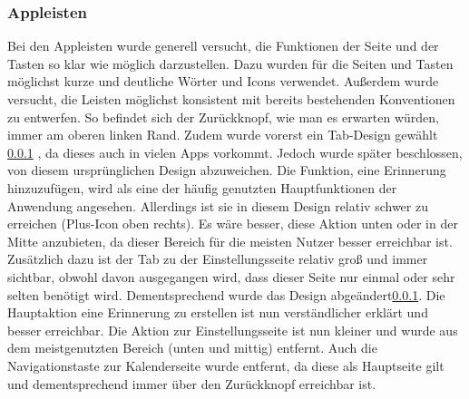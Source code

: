 \subsubsection{Appleisten}
Bei den Appleisten wurde generell versucht, die Funktionen der Seite und der Tasten so klar wie möglich darzustellen. %
	Dazu wurden für die Seiten und Tasten möglichst kurze und deutliche Wörter und Icons verwendet. %
	Außerdem wurde versucht, die Leisten möglichst konsistent mit bereits bestehenden Konventionen zu entwerfen. So befindet sich der Zurückknopf, wie man es erwarten würden, immer am oberen linken Rand. Zudem wurde vorerst ein \glqq Tab-Design\grqq{} gewählt \ref{} \myTodo, da dieses auch in vielen Apps vorkommt.\newline%
	Jedoch wurde später beschlossen, von diesem ursprünglichen Design abzuweichen. Die Funktion, eine Erinnerung hinzuzufügen, wird als eine der häufig genutzten Hauptfunktionen der Anwendung angesehen. Allerdings ist sie in diesem Design relativ schwer zu erreichen (Plus-Icon oben rechts). Es wäre besser, diese Aktion unten oder in der Mitte anzubieten, da dieser Bereich für die meisten Nutzer besser erreichbar ist\cite{konventionen_platforms_ios}. Zusätzlich dazu ist der Tab zu der Einstellungsseite relativ groß und immer sichtbar, obwohl davon ausgegangen wird, dass dieser Seite nur einmal oder sehr selten benötigt wird.\newline%
	Dementsprechend wurde das Design abgeändert\ref{}\myTodo. Die Hauptaktion eine Erinnerung zu erstellen ist nun verständlicher erklärt und besser erreichbar. Die Aktion zur Einstellungsseite ist nun kleiner und wurde aus dem meistgenutzten Bereich (unten und mittig) entfernt. Auch die Navigationstaste zur Kalenderseite wurde entfernt, da diese als Hauptseite gilt und dementsprechend immer über den Zurückknopf erreichbar ist.
	
